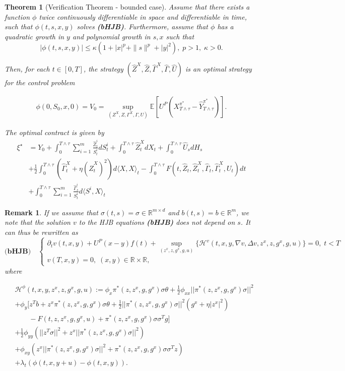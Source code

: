 \documentclass[11pt,a4paper]{article}
\theoremstyle{thmstyleone}%
\newtheorem{theorem}{Theorem}%
\theoremstyle{thmstyletwo}%
\newtheorem{remark}{Remark}%
\theoremstyle{thmstylethree}%
\newcommand{\T}{T \wedge \tau}
\begin{document}
\begin{theorem}[Verification Theorem - bounded case]\label{thm:verif}
Assume that there exists a function $\phi$ twice continuously differentiable in space and differentiable in time, such that $\phi(t,s,x,y)$ solves \textbf{(bHJB)}. Furthermore, assume that $\phi$ has a quadratic growth in $y$ and polynomial growth in $s,x$ such that 
\[|\phi(t,s,x,y)|\leq \kappa(1+|x|^p+\|s\|^p+|y|^2),\; p>1,\; \kappa>0.\]

Then, for each $t \in [0,T]$, the strategy $(\hat{Z}^X, \hat{Z}, \hat{\Gamma}^X, \hat{\Gamma}, \hat{U})$ is an optimal strategy for the control problem 

\begin{align*}
    \phi(0,S_0,x,0)=V_0 =  \sup_{(Z^X, Z, \Gamma^X, \Gamma, U)} \mathbb{E}\left[U^P(X_{T \wedge \tau}^{\pi^*} - \hat Y^{\pi^*}_{T \wedge \tau})\right].
\end{align*}

The optimal contract is given by 
\begin{align*}
    \xi^\star 
    &= Y_0+ \int_{0}^{\T} \sum_{i=1}^m \frac{\hat{Z}^i_t}{S^i_t} dS^i_t + \int_0^{\T} \hat{Z}_t^X dX_t + \int_{0}^{\T} \hat{U}_s dH_s \\
    &+ \frac{1}{2}\int_0^{\T} (\hat{\Gamma}_t^X + \eta (\hat{Z}_t^X)^2 ) d\langle X, X\rangle_t - \int_0^{\T} F(t, \hat{Z}_t, \hat{Z}_t^X, \hat{\Gamma}_t, \hat{\Gamma}_t^X,U_t) dt\\
    &+\int_0^{\T} \sum_{i=1}^m \frac{\hat{\Gamma}^i_s}{S^i_t} d\langle S^i, X\rangle_t 
\end{align*}
\end{theorem}

\begin{remark}
  If we assume that $\sigma(t,s)=\sigma\in \mathbb R^{m\times d}$ and $b(t,s)=b\in\mathbb R^m$, we note that the solution $v$ to the HJB equations \textbf{(bHJB)} does not depend on $s$. It can thus be rewritten as \[
\textbf{(bHJB)}\quad\begin{cases}
  \partial_t v(t,x,y) + U^P(x - y) f(t) + \sup_{(z^x, z, g^x, g, u)}\bigl \{   \mathcal H^v(t, x, y, \nabla v, \Delta v, z^x, z, g^x, g, u) \bigl \}=0,\; t<T\\
v(T,x,y)=0,\; (x,y)\in\mathbb R\times \mathbb R,
\end{cases}
\]
where

\begin{align*}
&\mathcal H^\phi(t,x,y,z^x,z,g^x,g,u):= \phi_x \pi^*(z,z^x,g,g^x)\sigma \theta + \frac{1}{2}\phi_{xx}||\pi^*(z,z^x,g,g^x) \sigma||^2\\
& + \phi_y \Big[z^T b + z^x \pi^*(z,z^x,g,g^x) \sigma \theta
+ \frac{1}{2}||\pi^*(z,z^x,g,g^x)\sigma||^2(g^x + \eta |z^x|^2) \\
&\qquad-  F(t, z, z^x, g, g^x,u) + \pi^*(z,z^x,g,g^x) \sigma \sigma^T g\Big]
   \\
&+ \frac{1}{2}\phi_{yy} (||z^T\sigma||^2 + z^x|| \pi^*(z,z^x,g,g^x)\sigma||^2) \\
&+ \phi_{xy} (z^x ||\pi^*(z,z^x,g,g^x) \sigma||^2  + \pi^*(z,z^x,g,g^x)\sigma\sigma^T  z)\\
&+\lambda_t(\phi(t, x, y+u) - \phi(t, x, y)).
\end{align*}
\end{remark}
\end{document}
